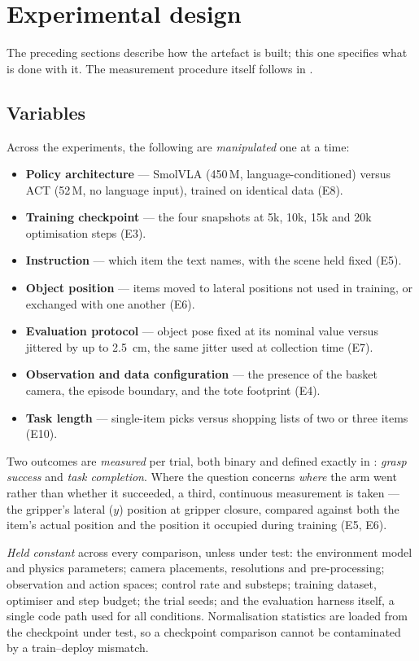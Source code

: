 \section{Experimental design}
\label{sec:m-experiments}
The preceding sections describe how the artefact is built; this one specifies what is
done with it. The measurement procedure itself follows in .

\subsection{Variables}
\label{sec:m-variables}
Across the experiments, the following are \emph{manipulated} one at a time:

\begin{itemize}
    \item \textbf{Policy architecture} --- SmolVLA (450\,M, language-conditioned)
    versus ACT (52\,M, no language input), trained on identical data (E8).
    \item \textbf{Training checkpoint} --- the four snapshots at 5k, 10k, 15k and
    20k optimisation steps (E3).
    \item \textbf{Instruction} --- which item the text names, with the scene held
    fixed (E5).
    \item \textbf{Object position} --- items moved to lateral positions not used in
    training, or exchanged with one another (E6).
    \item \textbf{Evaluation protocol} --- object pose fixed at its nominal value
    versus jittered by up to \SI{2.5}{cm}, the same jitter used at collection time (E7).
    \item \textbf{Observation and data configuration} --- the presence of the basket
    camera, the episode boundary, and the tote footprint (E4).
    \item \textbf{Task length} --- single-item picks versus shopping lists of two or
    three items (E10).
\end{itemize}

Two outcomes are \emph{measured} per trial, both binary and defined exactly in
: \emph{grasp success} and \emph{task completion}. Where the
question concerns \emph{where} the arm went rather than whether it succeeded, a third,
continuous measurement is taken --- the gripper's lateral ($y$) position at gripper
closure, compared against both the item's actual position and the position it occupied
during training (E5, E6).

\emph{Held constant} across every comparison, unless under test: the environment model
and physics parameters; camera placements, resolutions and pre-processing; observation
and action spaces; control rate and substeps; training dataset, optimiser and step
budget; the trial seeds; and the evaluation harness itself, a single code path used for
all conditions. Normalisation statistics are loaded from the checkpoint under test, so a
checkpoint comparison cannot be contaminated by a train--deploy mismatch.

